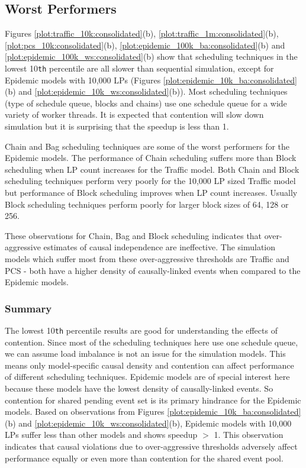 \documentclass[11pt]{book}
\begin{document}
\subsection{Worst Performers}
\label{subsec:worst_performers}
Figures \ref{plot:traffic_10k:consolidated}(b), \ref{plot:traffic_1m:consolidated}(b),
\ref{plot:pcs_10k:consolidated}(b), \ref{plot:epidemic_100k_ba:consolidated}(b) and
\ref{plot:epidemic_100k_ws:consolidated}(b) show that scheduling techniques in the lowest 10\texttt{th}
percentile are all slower than sequential simulation, except for Epidemic models with 10,000 LPs (Figures
\ref{plot:epidemic_10k_ba:consolidated}(b) and \ref{plot:epidemic_10k_ws:consolidated}(b)). Most
scheduling techniques (type of schedule queue, blocks and chains) use one schedule queue for a wide
variety of worker threads. It is expected that contention will slow down simulation but it is surprising
that the speedup is less than 1.

Chain and Bag scheduling techniques are some of the worst performers for the Epidemic models. The
performance of Chain scheduling suffers more than Block scheduling when LP count increases for the Traffic
model. Both Chain and Block scheduling techniques perform very poorly for the 10,000 LP sized Traffic model
but performance of Block scheduling improves when LP count increases. Usually Block scheduling techniques
perform poorly for larger block sizes of 64, 128 or 256.

These observations for Chain, Bag and Block scheduling indicates that over-aggressive estimates of
causal independence are ineffective. The simulation models which suffer most from these over-aggressive
thresholds are Traffic and PCS - both have a higher density of causally-linked events when compared to the
Epidemic models.

\subsubsection{Summary}
\label{subsubsec:summary_worst}
The lowest 10\texttt{th} percentile results are good for understanding the effects of contention.
Since most of the scheduling techniques here use one schedule queue, we can assume load imbalance is
not an issue for the simulation models. This means only model-specific causal density and contention
can affect performance of different scheduling techniques. Epidemic models are of special interest here
because these models have the lowest density of causally-linked events. So contention for shared pending
event set is its primary hindrance for the Epidemic models. Based on observations from Figures
\ref{plot:epidemic_10k_ba:consolidated}(b) and \ref{plot:epidemic_10k_ws:consolidated}(b), Epidemic
models with 10,000 LPs suffer less than other models and shows speedup $>$ 1. This observation indicates
that causal violations due to over-aggressive thresholds adversely affect performance equally or even
more than contention for the shared event pool.
\end{document}
